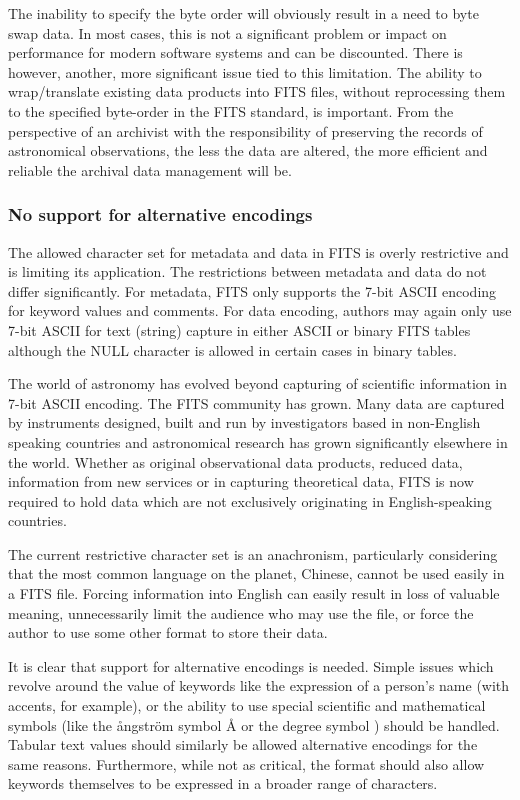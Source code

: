 \documentclass[final,authoryear,5p,times,twocolumn]{elsarticle}
\begin{document}
{{The inability to specify the byte order will obviously result in a 
need to byte swap data. In most cases, this is not a significant
problem or impact on performance for modern software systems and
can be discounted. There is however, another, more significant issue
tied to this limitation. The ability to wrap/translate existing data products 
into FITS files, without reprocessing them to the specified
byte-order in the FITS standard, is important. From
the perspective of an archivist with the responsibility of preserving the
records of astronomical observations, the less the data are altered, the
more efficient and reliable the archival data management will be.


\subsubsection{No support for alternative encodings}
\label{section_char_encoding}

The allowed character set for metadata and data in FITS is overly
restrictive and is limiting its application. The restrictions between
metadata and data do not differ significantly. For metadata, 
FITS only supports the 7-bit
ASCII encoding for keyword values and comments. For data encoding,
authors may again only use 7-bit ASCII for text (string) capture in
either ASCII or binary FITS tables although the NULL character is
allowed in certain cases in binary tables.


The world of astronomy has evolved beyond capturing of scientific
information in 7-bit ASCII encoding. The FITS community has grown.
Many data are captured by instruments designed, built and run by
investigators based in non-English speaking countries and astronomical
research has grown significantly elsewhere in the world. Whether as
original observational data products, reduced data, information from new
services or in capturing theoretical data, FITS is now required to hold
data which are not exclusively originating in English-speaking countries.


The current restrictive character set is an
anachronism, particularly considering that the most common language on the planet,
Chinese, cannot be used easily in a FITS file. Forcing information
into English can easily result in loss of valuable meaning, unnecessarily
limit the audience who may use the file, or force the author to use some other
format to store their data.


It is clear that support for alternative encodings is needed.
Simple issues which revolve around the value of keywords like the
expression of a person's name (with accents, for example), or the
ability to use special scientific and mathematical symbols (like the
\r{a}ngstr\"{o}m symbol \r{A} or the degree symbol \degree) should be
handled. Tabular text values should similarly be allowed alternative
encodings for the same reasons.  Furthermore, while not as critical, the
format should also allow keywords themselves to be expressed in a broader
range of characters.


}}
\end{document}
